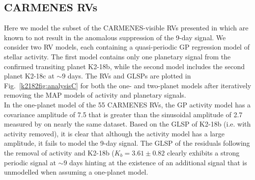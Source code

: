 \subsection{CARMENES RVs} \label{k2182sect:analysisC}
Here we model the subset of the CARMENES-visible RVs presented in  which are known to
not result in the anomalous suppression of the 9-day signal. We consider two RV models, each containing
a quasi-periodic GP regression model of stellar activity. The first model contains only one planetary
signal from the confirmed transiting planet K2-18b, while the second model  includes the
second planet K2-18c at $\sim 9$ days.
The RVs and GLSPs are plotted in Fig.~\ref{k2182fig:analysisC} for both the one- and two-planet models after
iteratively removing the MAP models of activity and planetary signals. \\

In the one-planet model  of the 55 CARMENES RVs, the GP activity model has a covariance amplitude of
7.5 \mps{} that is greater than the sinusoidal amplitude of 2.7 \mps{} measured by 
on nearly the same dataset. Based on the GLSP of K2-18b (i.e. with activity removed), it is clear that
although the activity model has a large amplitude, it fails to model the 9-day signal. The
GLSP of the residuals following the removal of activity and K2-18b ($K_b=3.61 \pm 0.82$ \mps{)} clearly
exhibits a strong periodic signal at $\sim 9$ days hinting at the existence of an additional signal that
is unmodelled when assuming a one-planet model. \\

